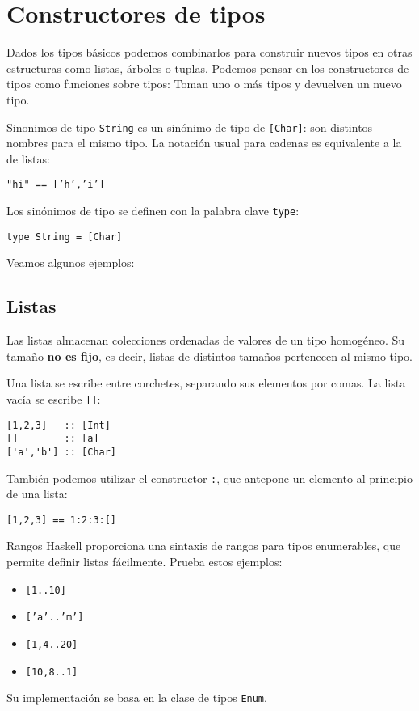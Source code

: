 \section{Constructores de tipos}

Dados los tipos básicos podemos combinarlos para construir nuevos tipos en otras
estructuras como listas, árboles o tuplas. Podemos pensar en los constructores de
tipos como funciones sobre tipos: Toman uno o más tipos y devuelven un nuevo tipo.

\begin{extra}{Sinonimos de tipo}
\texttt{String} es un sinónimo de tipo de \texttt{[Char]}:
son distintos nombres para el mismo tipo. La notación usual para
cadenas es equivalente a la de listas:

\espacio

\texttt{"hi" == ['h','i']}

\espacio

Los sinónimos de tipo se definen con la palabra clave \texttt{type}:

\espacio

\texttt{type String = [Char]}
\end{extra}

Veamos algunos ejemplos:

\subsection{Listas}
Las listas almacenan colecciones ordenadas de valores de un tipo homogéneo.
Su tamaño \textbf{no es fijo}, es decir, listas de distintos tamaños pertenecen
al mismo tipo.

Una lista se escribe entre corchetes, separando sus elementos por comas.
La lista vacía se escribe \texttt{[]}:

\begin{lstlisting}
[1,2,3]   :: [Int]
[]        :: [a]
['a','b'] :: [Char]
\end{lstlisting}

También podemos utilizar el constructor \texttt{:},
que antepone un elemento al principio de una lista:
\begin{lstlisting}
[1,2,3] == 1:2:3:[]
\end{lstlisting}

\begin{extra}{Rangos}
Haskell proporciona una sintaxis de rangos para tipos enumerables, que permite
definir listas fácilmente. Prueba estos ejemplos:

\begin{itemize}
  \item \texttt{[1..10]}
  \item \texttt{['a'..'m']}
  \item \texttt{[1,4..20]}
  \item \texttt{[10,8..1]}
\end{itemize}

Su implementación se basa en la clase de tipos \texttt{Enum}.
\end{extra}

